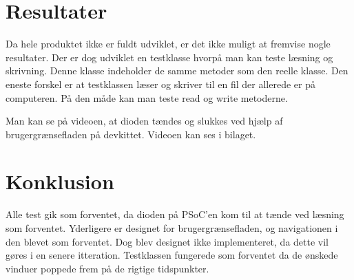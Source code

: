 \section*{Resultater}

Da hele produktet ikke er fuldt udviklet, er det ikke muligt at fremvise nogle resultater. Der er dog udviklet en testklasse hvorpå man kan teste læsning og skrivning. Denne klasse indeholder de samme metoder som den reelle klasse. Den eneste forskel er at testklassen læser og skriver til en fil der allerede er på computeren. På den måde kan man teste read og write metoderne.

Man kan se på videoen, at dioden tændes og slukkes ved hjælp af brugergrænsefladen på devkittet. Videoen kan ses i bilaget.

\section*{Konklusion}

Alle test gik som forventet, da dioden på PSoC'en kom til at tænde ved læsning som forventet. Yderligere er designet for brugergrænsefladen, og navigationen i den blevet som forventet. Dog blev designet ikke implementeret, da dette vil gøres i en senere itteration. Testklassen fungerede som forventet da de ønskede vinduer poppede frem på de rigtige tidspunkter.